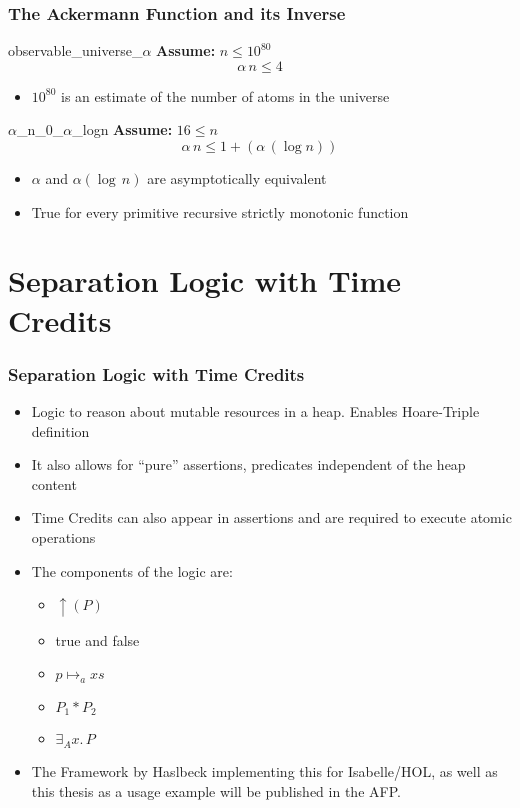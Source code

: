 \begin{frame}
	\frametitle{The Ackermann Function and its Inverse}
	\vspace{0.6cm}
	\begin{lma}{observable\_universe\_$\alpha$}
		\newline
		\textbf{Assume:} $n \leq 10^{80} $
		\begin{equation}
		\alpha \, n \leq 4 \label{universealpha}
		\end{equation}
	\end{lma}	
\begin{itemize}
	\item $10^{80}$ is an estimate of the number of atoms in the universe
\end{itemize}

\begin{lma}{$\alpha$\_n\_0\_$\alpha$\_logn}
	\newline
	\textbf{Assume:} $16 \leq n$
	\begin{equation}
	\alpha \, n \leq 1 + (\alpha \, (\log{n}))
	\end{equation}
\end{lma}
\begin{itemize}
	\item $\alpha$ and $\alpha(\log\, n)$ are asymptotically equivalent
	\item True for every primitive recursive strictly monotonic function
\end{itemize}
\end{frame}

\section{Separation Logic with Time Credits}
\begin{frame}
	\frametitle{Separation Logic with Time Credits}
	\begin{itemize}
		\item Logic to reason about mutable resources in a heap. Enables Hoare-Triple definition
		\item It also allows for ``pure'' assertions, predicates independent of the heap content
		\item Time Credits can also appear in assertions and are required to execute atomic operations
		\item The components of the logic are: \begin{itemize}
			\item $\uparrow(P)$ 
			\item true and false 
			\item $p \mapsto_a xs$ 
			\item $P_1 * P_2$ 
			\item $\exists_A x.\, P$ 
		\end{itemize}
	\item The Framework by Haslbeck implementing this for Isabelle/HOL, as well as this thesis as a usage example will be published in the AFP.
	\end{itemize}
\end{frame}


